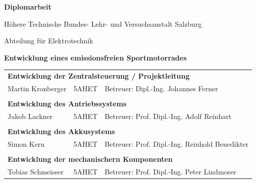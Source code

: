 \vspace*{20mm}
\begin{center} 
\begin{Huge}\textbf{Diplomarbeit}\end{Huge} \par \bigskip 
\begin{Large}Höhere Technische Bundes- Lehr- und Versuchsanstalt Salzburg \par \medskip 
Abteilung für Elektrotechnik\end{Large} 
\vspace*{20mm}

\begin{Huge}
\textbf{Entwicklung eines emissionsfreien Sportmotorrades \\[1ex]}
\end{Huge}
\vspace{\fill}



\begin{tabular}{lll}
\multicolumn{3}{l}{\textbf{Entwicklung der Zentralsteuerung / Projektleitung}} \\
 Martin Kronberger & 5AHET & Betreuer: Dipl.-Ing. Johannes Ferner\\
      &       &      \\
\multicolumn{3}{l}{\textbf{Entwicklung des Antriebssystems}}\\
Jakob Lackner & 5AHET & Betreuer: Prof. Dipl.-Ing. Adolf Reinhart \\
      &       &      \\
\multicolumn{3}{l}{\textbf{Entwicklung des Akkusystems}} \\
Simon Kern & 5AHET & Betreuer: Prof. Dipl.-Ing. Reinhold Benedikter\\
      &       &      \\
\multicolumn{3}{l}{\textbf{Entwicklung der mechanischern Komponenten}} \\
Tobias Schmeisser & 5AHET & Betreuer: Prof. Dipl.-Ing. Peter Lindmoser\\
\end{tabular}
\end{center}
\vspace{\fill}

